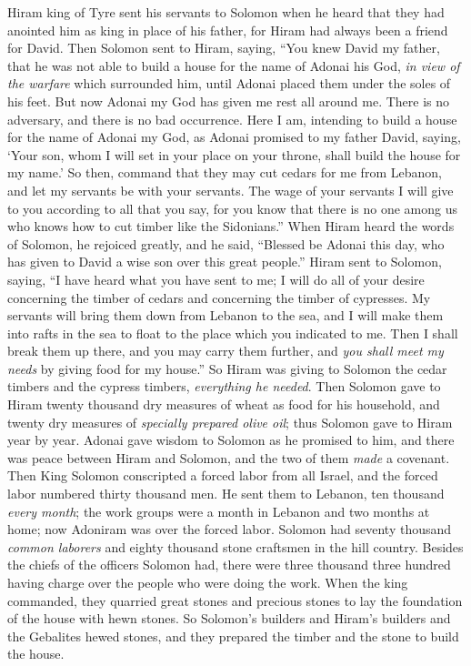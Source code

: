 \begin{biblechapter} %
 Hiram king of Tyre sent his servants to Solomon when he heard that they had anointed him as king in place of his father, for Hiram had always been a friend for David.
\verse Then Solomon sent to Hiram, saying,
\verse “You knew David my father, that he was not able to build a house for the name of Adonai his God, \textit{in view of the warfare} which surrounded him, until Adonai placed them under the soles of his feet.
\verse But now Adonai my God has given me rest all around me. There is no adversary, and there is no bad occurrence.
\verse Here I am, intending to build a house for the name of Adonai my God, as Adonai promised to my father David, saying, ‘Your son, whom I will set in your place on your throne, shall build the house for my name.’
\verse So then, command that they may cut cedars for me from Lebanon, and let my servants be with your servants. The wage of your servants I will give to you according to all that you say, for you know that there is no one among us who knows how to cut timber like the Sidonians.”
\verse When Hiram heard the words of Solomon, he rejoiced greatly, and he said, “Blessed be Adonai this day, who has given to David a wise son over this great people.”
\verse Hiram sent to Solomon, saying, “I have heard what you have sent to me; I will do all of your desire concerning the timber of cedars and concerning the timber of cypresses.
\verse My servants will bring them down from Lebanon to the sea, and I will make them into rafts in the sea to float to the place which you indicated to me. Then I shall break them up there, and you may carry them further, and \textit{you shall meet my needs} by giving food for my house.”
\verse So Hiram was giving to Solomon the cedar timbers and the cypress timbers, \textit{everything he needed}.
\verse Then Solomon gave to Hiram twenty thousand dry measures of wheat as food for his household, and twenty dry measures of \textit{specially prepared olive oil}; thus Solomon gave to Hiram year by year.
\verse Adonai gave wisdom to Solomon as he promised to him, and there was peace between Hiram and Solomon, and the two of them \textit{made} a covenant.
\verse Then King Solomon conscripted a forced labor from all Israel, and the forced labor numbered thirty thousand men.
\verse He sent them to Lebanon, ten thousand \textit{every month}; the work groups were a month in Lebanon and two months at home; now Adoniram was over the forced labor.
\verse Solomon had seventy thousand \textit{common laborers} and eighty thousand stone craftsmen in the hill country.
\verse Besides the chiefs of the officers Solomon had, there were three thousand three hundred having charge over the people who were doing the work.
\verse When the king commanded, they quarried great stones and precious stones to lay the foundation of the house with hewn stones.
\verse So Solomon’s builders and Hiram’s builders and the Gebalites hewed stones, and they prepared the timber and the stone to build the house.
\end{biblechapter}

